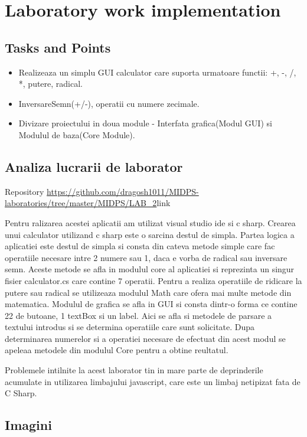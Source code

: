 \section{Laboratory work implementation}

\subsection{Tasks and Points}

\begin{itemize}
	\item Realizeaza un simplu GUI calculator care suporta urmatoare functii: +, -, /, *, putere, radical. 
	\item InversareSemn(+/-), operatii cu numere zecimale.
	\item Divizare proiectului in doua module - Interfata grafica(Modul GUI) si Modulul de baza(Core Module).
\end{itemize}

\subsection{Analiza lucrarii de laborator}

Repository \url{https://github.com/dragosh1011/MIDPS-laboratories/tree/master/MIDPS/LAB_2}{link}

Pentru ralizarea acestei aplicatii am utilizat visual studio ide si c sharp. 
Crearea unui calculator utilizand c sharp este o sarcina destul de simpla. Partea logica a aplicatiei este destul de simpla si consta din cateva metode simple care fac operatiile necesare intre 2 numere sau 1, daca e vorba de radical sau inversare semn. Aceste metode se afla in modulul core al aplicatiei si reprezinta un singur fisier calculator.cs care contine 7 operatii. Pentru a realiza operatiile de ridicare la putere sau radical se utilizeaza modulul Math care ofera mai multe metode din matematica. 
Modulul de grafica se afla in GUI si consta dintr-o forma ce contine 22 de butoane, 1 textBox si un label. Aici se afla si metodele de parsare a textului introdus si se determina operatiile care sunt solicitate. Dupa determinarea numerelor si a operatiei necesare de efectuat din acest modul se apeleaa metodele din modulul Core pentru a obtine reultatul.

Problemele intilnite la acest laborator tin in mare parte de deprinderile acumulate in utilizarea limbajului javascript, care este un limbaj netipizat fata de C Sharp. 

\break
\subsection{Imagini}

